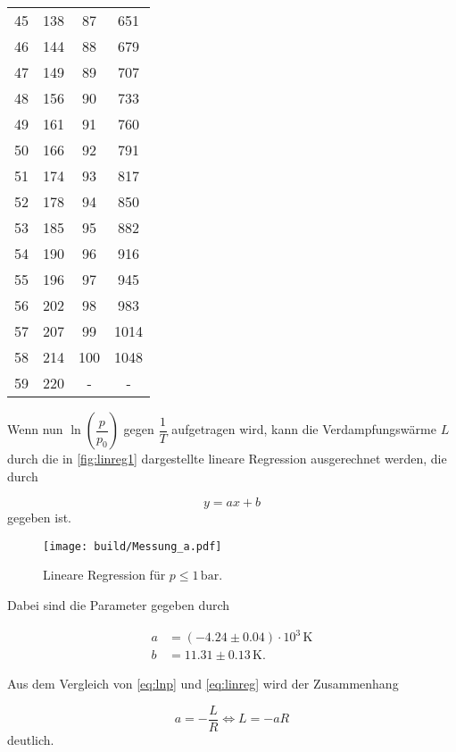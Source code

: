 \begin{table}[H]
\begin{tabular}{S[table-format=2.0] S[table-format=3.0] S[table-format=3.0] S[table-format=3.0]}
            45 & 138 & 87  & 651  \\
            46 & 144 & 88  & 679  \\
            47 & 149 & 89  & 707  \\
            48 & 156 & 90  & 733  \\
            49 & 161 & 91  & 760  \\
            50 & 166 & 92  & 791  \\
            51 & 174 & 93  & 817  \\
            52 & 178 & 94  & 850  \\
            53 & 185 & 95  & 882  \\
            54 & 190 & 96  & 916  \\
            55 & 196 & 97  & 945  \\
            56 & 202 & 98  & 983  \\
            57 & 207 & 99  & 1014 \\
            58 & 214 & 100 & 1048 \\
            59 & 220 & {-} & {-}  \\
      \bottomrule
    \end{tabular}
  \end{table}

Wenn nun $\ln{\left(\dfrac{p}{p_0} \right)}$ gegen $\dfrac{1}{T}$ aufgetragen wird, kann die Verdampfungswärme $L$ durch die in \autoref{fig:linreg1} dargestellte lineare Regression ausgerechnet werden, die durch

\begin{equation}
  y = a x + b
  \label{eq:linreg}
\end{equation} gegeben ist.

\begin{figure}
  \centering
  \texttt{[image: build/Messung\_a.pdf]}
  \caption{Lineare Regression für $p \leq 1 \,\unit{\bar}$.}
  \label{fig:linreg1}
\end{figure}

Dabei sind die Parameter gegeben durch 

\begin{align*}
a & = (-4.24 \pm 0.04) \cdot 10^3 \, \unit{\kelvin}\\
b & = 11.31 \pm 0.13 \, \unit{\kelvin}.
\end{align*}

Aus dem Vergleich von \eqref{eq:lnp} und \eqref{eq:linreg} wird der Zusammenhang

\begin{equation*}
  a = - \frac{L}{R} \Leftrightarrow L = -a R
\end{equation*} deutlich.

